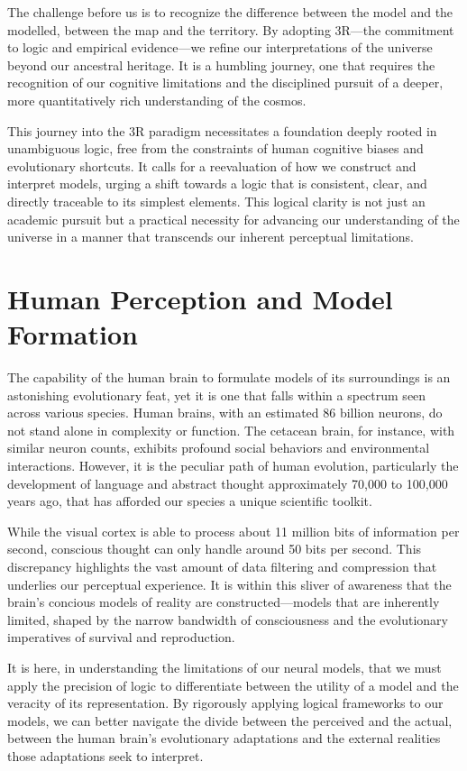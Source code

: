 \documentclass[12pt]{article}
\begin{document}
The challenge before us is to recognize the difference between the model and the modelled, between the map and the territory. By adopting 3R—the commitment to logic and empirical evidence—we refine our interpretations of the universe beyond our ancestral heritage. It is a humbling journey, one that requires the recognition of our cognitive limitations and the disciplined pursuit of a deeper, more quantitatively rich understanding of the cosmos.

This journey into the 3R paradigm necessitates a foundation deeply rooted in unambiguous logic, free from the constraints of human cognitive biases and evolutionary shortcuts. It calls for a reevaluation of how we construct and interpret models, urging a shift towards a logic that is consistent, clear, and directly traceable to its simplest elements. This logical clarity is not just an academic pursuit but a practical necessity for advancing our understanding of the universe in a manner that transcends our inherent perceptual limitations.

\section*{Human Perception and Model Formation}
The capability of the human brain to formulate models of its surroundings is an astonishing evolutionary feat, yet it is one that falls within a spectrum seen across various species. Human brains, with an estimated 86 billion neurons, do not stand alone in complexity or function. The cetacean brain, for instance, with similar neuron counts, exhibits profound social behaviors and environmental interactions. However, it is the peculiar path of human evolution, particularly the development of language and abstract thought approximately 70,000 to 100,000 years ago, that has afforded our species a unique scientific toolkit.

While the visual cortex is able to process about 11 million bits of information per second, conscious thought can only handle around 50 bits per second. This discrepancy highlights the vast amount of data filtering and compression that underlies our perceptual experience. It is within this sliver of awareness that the brain's concious models of reality are constructed—models that are inherently limited, shaped by the narrow bandwidth of consciousness and the evolutionary imperatives of survival and reproduction.

It is here, in understanding the limitations of our neural models, that we must apply the precision of logic to differentiate between the utility of a model and the veracity of its representation. By rigorously applying logical frameworks to our models, we can better navigate the divide between the perceived and the actual, between the human brain's evolutionary adaptations and the external realities those adaptations seek to interpret.
\end{document}
